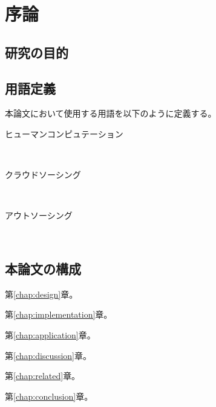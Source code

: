 \chapter{序論}
\label{chap:introduction}

\section{研究の目的}

\section{用語定義}

本論文において使用する用語を以下のように定義する。

\begin{description}
  \item [ヒューマンコンピュテーション] \mbox{}\\
  \item [クラウドソーシング] \mbox{}\\
  \item [アウトソーシング] \mbox{}\\

\end{description}

\section{本論文の構成}

第\ref{chap:design}章。

第\ref{chap:implementation}章。

第\ref{chap:application}章。

第\ref{chap:discussion}章。

第\ref{chap:related}章。

第\ref{chap:conclusion}章。
